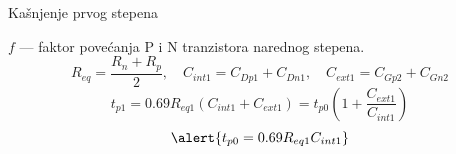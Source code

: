 \begin{frame}[label=09_3-s016]{Kašnjenje prvog stepena}
\begin{center}

\end{center}$f$ — faktor povećanja P i N tranzistora narednog stepena.
\[R_{eq}=\frac{R_n+R_p}2,\quad C_{int1}=C_{Dp1}+C_{Dn1},\quad C_{ext1}=C_{Gp2}+C_{Gn2}\]
\[t_{p1}=0.69R_{eq1}(C_{int1}+C_{ext1})
=t_{p0}\left(1+\frac{C_{ext1}}{C_{int1}}\right)\]
\[\alert{t_{p0}=0.69R_{eq1}C_{int1}}\]
\end{frame}
